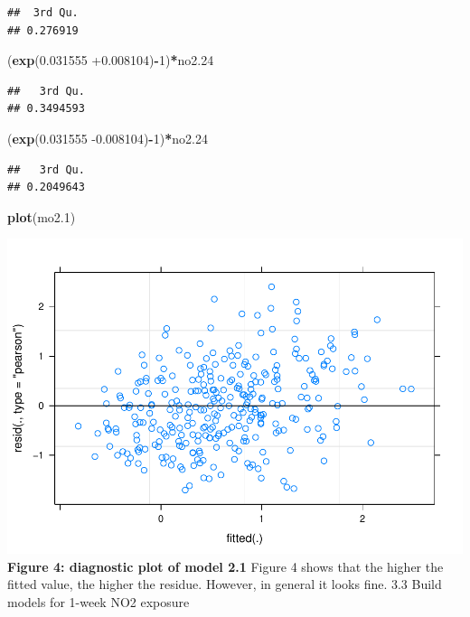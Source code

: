 \documentclass[12pt,]{article}
\newenvironment{Shaded}{\begin{snugshade}}{\end{snugshade}}
\newcommand{\DecValTok}[1]{\textcolor[rgb]{0.00,0.00,0.81}{#1}}
\newcommand{\FloatTok}[1]{\textcolor[rgb]{0.00,0.00,0.81}{#1}}
\newcommand{\KeywordTok}[1]{\textcolor[rgb]{0.13,0.29,0.53}{\textbf{#1}}}
\newcommand{\NormalTok}[1]{#1}
\newcommand{\OperatorTok}[1]{\textcolor[rgb]{0.81,0.36,0.00}{\textbf{#1}}}
\begin{document}
\begin{verbatim}
##  3rd Qu. 
## 0.276919
\end{verbatim}

\begin{Shaded}
\begin{Highlighting}[]
\NormalTok{(}\KeywordTok{exp}\NormalTok{(}\FloatTok{0.031555} \FloatTok{+0.008104}\NormalTok{)}\OperatorTok{-}\DecValTok{1}\NormalTok{)}\OperatorTok{*}\NormalTok{no2}\FloatTok{.24}
\end{Highlighting}
\end{Shaded}

\begin{verbatim}
##   3rd Qu. 
## 0.3494593
\end{verbatim}

\begin{Shaded}
\begin{Highlighting}[]
\NormalTok{(}\KeywordTok{exp}\NormalTok{(}\FloatTok{0.031555} \FloatTok{-0.008104}\NormalTok{)}\OperatorTok{-}\DecValTok{1}\NormalTok{)}\OperatorTok{*}\NormalTok{no2}\FloatTok{.24}
\end{Highlighting}
\end{Shaded}

\begin{verbatim}
##   3rd Qu. 
## 0.2049643
\end{verbatim}

\begin{Shaded}
\begin{Highlighting}[]
\KeywordTok{plot}\NormalTok{(mo2}\FloatTok{.1}\NormalTok{)}
\end{Highlighting}
\end{Shaded}

\includegraphics{872_files/figure-latex/unnamed-chunk-5-1.pdf}
\center \textbf{Figure 4: diagnostic plot of model 2.1} \center Figure 4
shows that the higher the fitted value, the higher the residue. However,
in general it looks fine. 3.3 Build models for 1-week NO2 exposure
\end{document}
